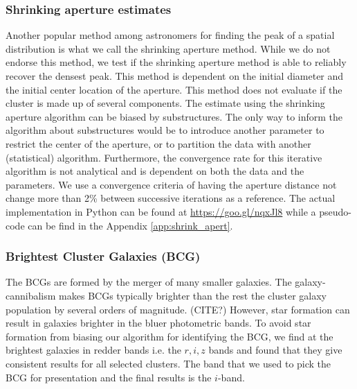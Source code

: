 \subsubsection{Shrinking aperture estimates}

Another popular method among astronomers for finding the peak of a spatial
distribution is what we call the shrinking aperture method.
While we do not endorse this method,
we test if the shrinking aperture method is able to reliably recover the 
densest peak.
This method is dependent on the initial diameter and the initial center 
location of the aperture.
This method does not evaluate if the cluster is made up of
several components.
The estimate using the shrinking aperture algorithm can be biased by
substructures. The only way to inform the algorithm about substructures would
be to introduce another parameter to restrict the center of the aperture, or to
partition the data with another (statistical) algorithm.
Furthermore, the convergence rate for this iterative algorithm is not
analytical and is dependent on both the data and the parameters. We use a
convergence criteria of having the aperture distance not change more than 2\% 
between successive iterations as a reference. The actual implementation in
Python can be found at \href{https://goo.gl/nqxJl8}{https://goo.gl/nqxJl8} while
a pseudo-code can be find in the Appendix \ref{app:shrink_apert}.

\subsubsection{Brightest Cluster Galaxies (BCG)}
The BCGs are formed by the merger of many smaller
galaxies. The galaxy-cannibalism makes BCGs typically brighter than the rest 
the cluster galaxy population by several orders of magnitude. (CITE?)
However, star formation can result
in galaxies brighter in the bluer photometric bands.
To avoid star formation from biasing our algorithm for identifying the
BCG, we find at the brightest galaxies in redder bands i.e. the $r, i, z$
bands and found that they give consistent results for all selected clusters. 
The band that we used to pick the BCG for presentation and the final results 
is the $i$-band. 

